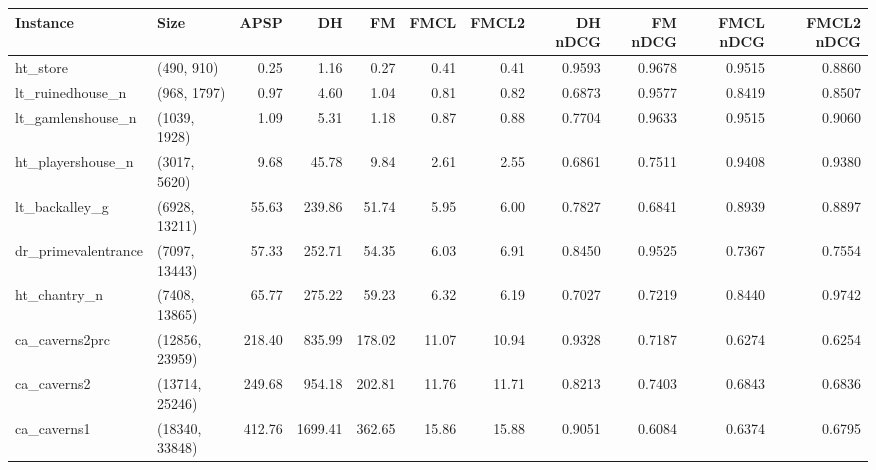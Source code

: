 \begin{tabular}{llrrrrrrrrr}
\toprule
           Instance &           Size &   APSP &      DH &     FM &  FMCL &  FMCL2 &  DH nDCG &  FM nDCG &  FMCL nDCG &  FMCL2 nDCG \\
\midrule
           ht\_store &     (490, 910) &   0.25 &    1.16 &   0.27 &  0.41 &   0.41 &   0.9593 &   0.9678 &     0.9515 &      0.8860 \\
   lt\_ruinedhouse\_n &    (968, 1797) &   0.97 &    4.60 &   1.04 &  0.81 &   0.82 &   0.6873 &   0.9577 &     0.8419 &      0.8507 \\
  lt\_gamlenshouse\_n &   (1039, 1928) &   1.09 &    5.31 &   1.18 &  0.87 &   0.88 &   0.7704 &   0.9633 &     0.9515 &      0.9060 \\
  ht\_playershouse\_n &   (3017, 5620) &   9.68 &   45.78 &   9.84 &  2.61 &   2.55 &   0.6861 &   0.7511 &     0.9408 &      0.9380 \\
     lt\_backalley\_g &  (6928, 13211) &  55.63 &  239.86 &  51.74 &  5.95 &   6.00 &   0.7827 &   0.6841 &     0.8939 &      0.8897 \\
dr\_primevalentrance &  (7097, 13443) &  57.33 &  252.71 &  54.35 &  6.03 &   6.91 &   0.8450 &   0.9525 &     0.7367 &      0.7554 \\
       ht\_chantry\_n &  (7408, 13865) &  65.77 &  275.22 &  59.23 &  6.32 &   6.19 &   0.7027 &   0.7219 &     0.8440 &      0.9742 \\
     ca\_caverns2prc & (12856, 23959) & 218.40 &  835.99 & 178.02 & 11.07 &  10.94 &   0.9328 &   0.7187 &     0.6274 &      0.6254 \\
        ca\_caverns2 & (13714, 25246) & 249.68 &  954.18 & 202.81 & 11.76 &  11.71 &   0.8213 &   0.7403 &     0.6843 &      0.6836 \\
        ca\_caverns1 & (18340, 33848) & 412.76 & 1699.41 & 362.65 & 15.86 &  15.88 &   0.9051 &   0.6084 &     0.6374 &      0.6795 \\
\bottomrule
\end{tabular}
